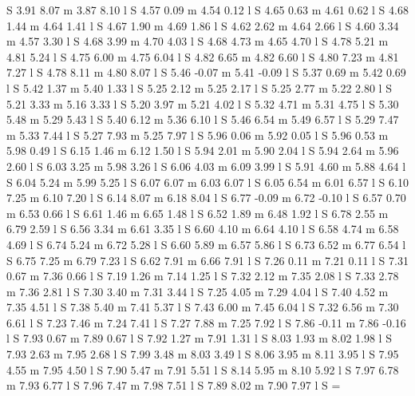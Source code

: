 {S
3.91 8.07 m
3.87 8.10 l
S
4.57 0.09 m
4.54 0.12 l
S
4.65 0.63 m
4.61 0.62 l
S
4.68 1.44 m
4.64 1.41 l
S
4.67 1.90 m
4.69 1.86 l
S
4.62 2.62 m
4.64 2.66 l
S
4.60 3.34 m
4.57 3.30 l
S
4.68 3.99 m
4.70 4.03 l
S
4.68 4.73 m
4.65 4.70 l
S
4.78 5.21 m
4.81 5.24 l
S
4.75 6.00 m
4.75 6.04 l
S
4.82 6.65 m
4.82 6.60 l
S
4.80 7.23 m
4.81 7.27 l
S
4.78 8.11 m
4.80 8.07 l
S
5.46 -0.07 m
5.41 -0.09 l
S
5.37 0.69 m
5.42 0.69 l
S
5.42 1.37 m
5.40 1.33 l
S
5.25 2.12 m
5.25 2.17 l
S
5.25 2.77 m
5.22 2.80 l
S
5.21 3.33 m
5.16 3.33 l
S
5.20 3.97 m
5.21 4.02 l
S
5.32 4.71 m
5.31 4.75 l
S
5.30 5.48 m
5.29 5.43 l
S
5.40 6.12 m
5.36 6.10 l
S
5.46 6.54 m
5.49 6.57 l
S
5.29 7.47 m
5.33 7.44 l
S
5.27 7.93 m
5.25 7.97 l
S
5.96 0.06 m
5.92 0.05 l
S
5.96 0.53 m
5.98 0.49 l
S
6.15 1.46 m
6.12 1.50 l
S
5.94 2.01 m
5.90 2.04 l
S
5.94 2.64 m
5.96 2.60 l
S
6.03 3.25 m
5.98 3.26 l
S
6.06 4.03 m
6.09 3.99 l
S
5.91 4.60 m
5.88 4.64 l
S
6.04 5.24 m
5.99 5.25 l
S
6.07 6.07 m
6.03 6.07 l
S
6.05 6.54 m
6.01 6.57 l
S
6.10 7.25 m
6.10 7.20 l
S
6.14 8.07 m
6.18 8.04 l
S
6.77 -0.09 m
6.72 -0.10 l
S
6.57 0.70 m
6.53 0.66 l
S
6.61 1.46 m
6.65 1.48 l
S
6.52 1.89 m
6.48 1.92 l
S
6.78 2.55 m
6.79 2.59 l
S
6.56 3.34 m
6.61 3.35 l
S
6.60 4.10 m
6.64 4.10 l
S
6.58 4.74 m
6.58 4.69 l
S
6.74 5.24 m
6.72 5.28 l
S
6.60 5.89 m
6.57 5.86 l
S
6.73 6.52 m
6.77 6.54 l
S
6.75 7.25 m
6.79 7.23 l
S
6.62 7.91 m
6.66 7.91 l
S
7.26 0.11 m
7.21 0.11 l
S
7.31 0.67 m
7.36 0.66 l
S
7.19 1.26 m
7.14 1.25 l
S
7.32 2.12 m
7.35 2.08 l
S
7.33 2.78 m
7.36 2.81 l
S
7.30 3.40 m
7.31 3.44 l
S
7.25 4.05 m
7.29 4.04 l
S
7.40 4.52 m
7.35 4.51 l
S
7.38 5.40 m
7.41 5.37 l
S
7.43 6.00 m
7.45 6.04 l
S
7.32 6.56 m
7.30 6.61 l
S
7.23 7.46 m
7.24 7.41 l
S
7.27 7.88 m
7.25 7.92 l
S
7.86 -0.11 m
7.86 -0.16 l
S
7.93 0.67 m
7.89 0.67 l
S
7.92 1.27 m
7.91 1.31 l
S
8.03 1.93 m
8.02 1.98 l
S
7.93 2.63 m
7.95 2.68 l
S
7.99 3.48 m
8.03 3.49 l
S
8.06 3.95 m
8.11 3.95 l
S
7.95 4.55 m
7.95 4.50 l
S
7.90 5.47 m
7.91 5.51 l
S
8.14 5.95 m
8.10 5.92 l
S
7.97 6.78 m
7.93 6.77 l
S
7.96 7.47 m
7.98 7.51 l
S
7.89 8.02 m
7.90 7.97 l
S
} \newcount \THPa\THPa=\pdflastobj
